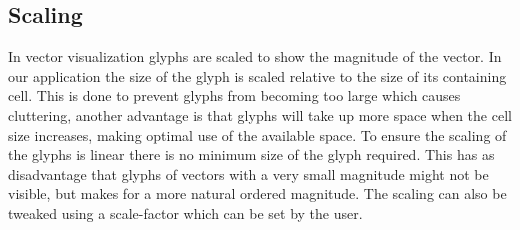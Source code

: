 \subsection{Scaling} %
\label{sub:scaling}
In vector visualization glyphs are scaled to show the magnitude of the vector. In our application the size of the glyph is scaled relative to the size of its containing cell. This is done to prevent glyphs from becoming too large which causes cluttering, another advantage is that glyphs will take up more space when the cell size increases, making optimal use of the available space. To ensure the scaling of the glyphs is linear there is no minimum size of the glyph required. This has as disadvantage that glyphs of vectors with a very small magnitude might not be visible, but makes for a more natural ordered magnitude. The scaling can also be tweaked using a scale-factor which can be set by the user.
